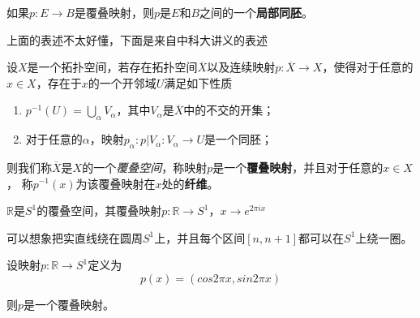 \vspace*{1em}

\begin{define}
    如果$p:E\rightarrow B$是覆叠映射，则$p$是$E$和$B$之间的一个\textbf{局部同胚}。
\end{define}

\vspace*{1em}

上面的表述不太好懂，下面是来自中科大讲义的表述

\vspace*{1em}

\begin{define}
    设$X$是一个拓扑空间，若存在拓扑空间$\overline{X}$以及连续映射$p:\overline{X}\rightarrow X$，使得对于任意的$x\in X$，存在于$x$的一个开邻域$U$满足如下性质
    \begin{enumerate}[itemindent=2em]
        \item $p^{-1}(U)=\bigcup_\alpha V_\alpha$，其中$V_\alpha$是$\overline{X}$中的不交的开集；
        \item 对于任意的$\alpha$，映射$p_\alpha:p|V_\alpha:V_\alpha\rightarrow U$是一个同胚；
    \end{enumerate}

    则我们称$\overline{X}$是$X$的一个\textsl{覆叠空间}，称映射$p$是一个\textbf{覆叠映射}，并且对于任意的$x\in X$，
    称$p^{-1}(x)$为该覆叠映射在$x$处的\textbf{纤维}。
\end{define}

\hspace{1em}


\begin{example}
    $\mathbb{R}$是$S^1$的覆叠空间，其覆叠映射$p:\mathbb{R}\rightarrow S^1$，$x\rightarrow e^{2\pi ix}$
\end{example}

\hspace{1em}

可以想象把实直线绕在圆周$S^1$上，并且每个区间$[n,n+1]$都可以在$S^1$上绕一圈。

\hspace{1em}

\begin{mdframed}
    \begin{theorem}
        设映射$p:\mathbb{R}\rightarrow S^1$定义为
        \begin{equation}
            p(x)=(cos2\pi x,sin 2\pi x)
        \end{equation}

        则$p$是一个覆叠映射。
    \end{theorem}
\end{mdframed}

